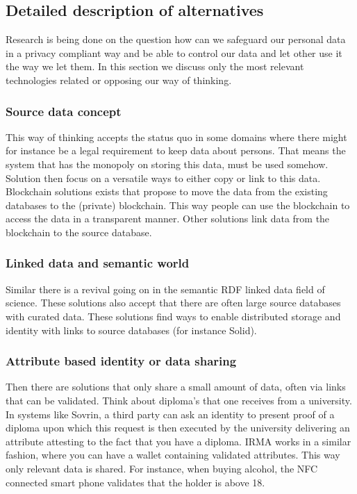 \documentclass{article}
\begin{document}
\subsection{Detailed description of alternatives}
%
Research is being done on the question how can we safeguard our personal data in a privacy compliant way and be able to control our data and let other use it the way we let them. In this section we discuss only the most relevant technologies related or opposing our way of thinking.

\subsubsection{Source data concept}
This way of thinking accepts the status quo in some domains where there might for instance be a legal requirement to keep data about persons. That means the system that has the monopoly on storing this data, must be used somehow. Solution then focus on a versatile ways to either copy or link to this data. Blockchain solutions exists that propose to move the data from the existing databases to the (private) blockchain. This way people can use the blockchain to access the data in a transparent manner. Other solutions link data from the blockchain to the source database.

\subsubsection{Linked data and semantic world}
Similar there is a revival going on in the semantic RDF linked data field of science. These solutions also accept that there are often large source databases with curated data. These solutions find ways to enable distributed storage and identity with links to source databases (for instance Solid).

\subsubsection{Attribute based identity or data sharing}
Then there are solutions that only share a small amount of data, often via links that can be validated. Think about diploma's that one receives from a university. In systems like Sovrin, a third party can ask an identity to present proof of a diploma upon which this request is then executed by the university delivering an attribute attesting to the fact that you have a diploma. IRMA works in a similar fashion, where you can have a wallet containing validated attributes. This way only relevant data is shared. For instance, when buying alcohol, the NFC connected smart phone validates that the holder is above 18.
\end{document}

